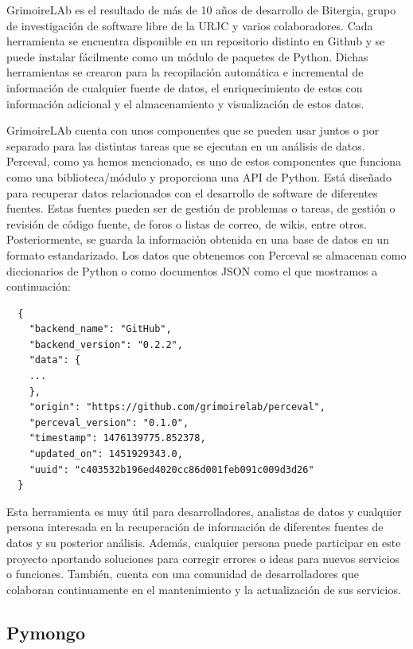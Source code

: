 \documentclass[a4paper, 12pt]{book}
\begin{document}
GrimoireLAb es el resultado de más de 10 años de desarrollo de Bitergia, grupo de investigación de software libre de la URJC y varios colaboradores. 
Cada herramienta se encuentra disponible en un repositorio distinto en Github y se puede instalar fácilmente como un módulo de paquetes de Python.
Dichas herramientas se crearon para la recopilación automática e incremental de información de cualquier fuente de datos, el enriquecimiento de estos con información adicional y el almacenamiento y visualización de estos datos. 


GrimoireLAb cuenta con unos componentes que se pueden usar juntos o por separado para las distintas tareas que se ejecutan en un análisis de datos.  
Perceval, como ya hemos mencionado, es uno de estos componentes que funciona como una biblioteca/módulo y proporciona una API de Python.
Está diseñado para recuperar datos relacionados con el desarrollo de software de diferentes fuentes.
Estas fuentes pueden ser de gestión de problemas o tareas, de gestión o revisión de código fuente, de foros o listas de correo, de wikis, entre otros.
Posteriormente, se guarda la información obtenida en una base de datos en un formato estandarizado.
Los datos que obtenemos con Perceval se almacenan como diccionarios de Python o como documentos JSON como el que mostramos a continuación: 

{\footnotesize
\begin{verbatim}
  {
    "backend_name": "GitHub",
    "backend_version": "0.2.2",
    "data": {
    ...
    },
    "origin": "https://github.com/grimoirelab/perceval",
    "perceval_version": "0.1.0",
    "timestamp": 1476139775.852378,
    "updated_on": 1451929343.0,
    "uuid": "c403532b196ed4020cc86d001feb091c009d3d26"
  }
\end{verbatim}
}

Esta herramienta es muy útil para desarrolladores, analistas de datos y cualquier persona interesada en la recuperación de información de diferentes fuentes de datos y su posterior análisis.
Además, cualquier persona puede participar en este proyecto aportando soluciones para corregir errores o ideas para nuevos servicios o funciones.
También, cuenta con una comunidad de desarrolladores que colaboran continuamente en el mantenimiento y la actualización de sus servicios. 

\subsection{Pymongo} %
\label{sec:pymongo} %
\end{document}
